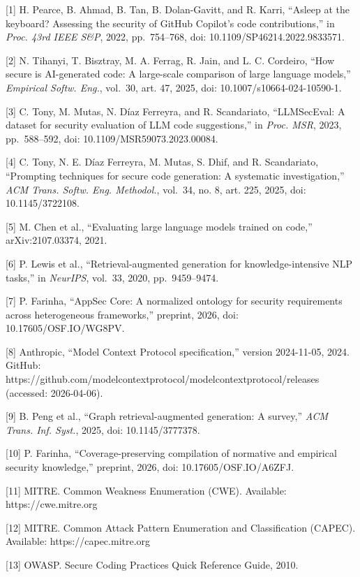 \documentclass[
]{article}
\begin{document}
{[}1{]} H. Pearce, B. Ahmad, B. Tan, B. Dolan-Gavitt, and R. Karri,
``Asleep at the keyboard? Assessing the security of GitHub Copilot's
code contributions,'' in \emph{Proc. 43rd IEEE S\&P}, 2022,
pp.~754--768, doi: 10.1109/SP46214.2022.9833571.

{[}2{]} N. Tihanyi, T. Bisztray, M. A. Ferrag, R. Jain, and L. C.
Cordeiro, ``How secure is AI-generated code: A large-scale comparison of
large language models,'' \emph{Empirical Softw. Eng.}, vol.~30, art. 47,
2025, doi: 10.1007/s10664-024-10590-1.

{[}3{]} C. Tony, M. Mutas, N. Díaz Ferreyra, and R. Scandariato,
``LLMSecEval: A dataset for security evaluation of LLM code
suggestions,'' in \emph{Proc. MSR}, 2023, pp.~588--592, doi:
10.1109/MSR59073.2023.00084.

{[}4{]} C. Tony, N. E. Díaz Ferreyra, M. Mutas, S. Dhif, and R.
Scandariato, ``Prompting techniques for secure code generation: A
systematic investigation,'' \emph{ACM Trans. Softw. Eng. Methodol.},
vol.~34, no. 8, art. 225, 2025, doi: 10.1145/3722108.

{[}5{]} M. Chen et al., ``Evaluating large language models trained on
code,'' arXiv:2107.03374, 2021.

{[}6{]} P. Lewis et al., ``Retrieval-augmented generation for
knowledge-intensive NLP tasks,'' in \emph{NeurIPS}, vol.~33, 2020,
pp.~9459--9474.

{[}7{]} P. Farinha, ``AppSec Core: A normalized ontology for security
requirements across heterogeneous frameworks,'' preprint, 2026, doi:
10.17605/OSF.IO/WG8PV.

{[}8{]} Anthropic, ``Model Context Protocol specification,'' version
2024-11-05, 2024. GitHub:
https://github.com/modelcontextprotocol/modelcontextprotocol/releases
(accessed: 2026-04-06).

{[}9{]} B. Peng et al., ``Graph retrieval-augmented generation: A
survey,'' \emph{ACM Trans. Inf. Syst.}, 2025, doi: 10.1145/3777378.

{[}10{]} P. Farinha, ``Coverage-preserving compilation of normative and
empirical security knowledge,'' preprint, 2026, doi:
10.17605/OSF.IO/A6ZFJ.

{[}11{]} MITRE. Common Weakness Enumeration (CWE). Available:
https://cwe.mitre.org

{[}12{]} MITRE. Common Attack Pattern Enumeration and Classification
(CAPEC). Available: https://capec.mitre.org

{[}13{]} OWASP. Secure Coding Practices Quick Reference Guide, 2010.
\end{document}
